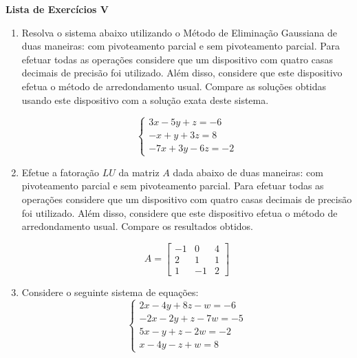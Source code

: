\documentclass[12pt,a4paper]{article}
\begin{document}
\begin{center}
 \textbf{Lista de Exercícios V}
\end{center}

% 

\begin{enumerate}
  
  \item Resolva o sistema abaixo utilizando o Método de Eliminação Gaussiana de duas maneiras: com pivoteamento parcial e sem pivoteamento parcial. Para efetuar todas as operações considere que um dispositivo 
com quatro casas decimais de precisão foi utilizado. Além disso, considere que este dispositivo efetua o método de arredondamento usual. Compare as 
soluções obtidas usando este dispositivo com a solução exata deste sistema.

  $$%
   \begin{cases}
    3x - 5y + z = -6 \\
    -x + y + 3z = 8 \\
    -7x + 3y - 6z = -2
   \end{cases}
  $$

  \item Efetue a fatoração $LU$ da matriz $A$ dada abaixo de duas maneiras: com pivoteamento parcial e sem pivoteamento parcial. 
Para efetuar todas as operações considere que um dispositivo com quatro casas decimais de precisão foi utilizado. 
Além disso, considere que este dispositivo efetua o método de arredondamento usual. Compare os resultados obtidos.

$$A =
\begin{bmatrix}
-1 & 0 & 4 \\
 2 & 1 & 1 \\
 1 & -1 &  2
\end{bmatrix}
$$

  
  \item Considere o seguinte sistema de equações:
  $$%
   \begin{cases}
    2x - 4y + 8z  - w = -6 \\
    -2x  - 2y + z - 7w = -5 \\
    5x  - y + z - 2w = -2 \\
    x - 4y - z + w = 8
   \end{cases}
  $$


\end{enumerate}
\end{document}
